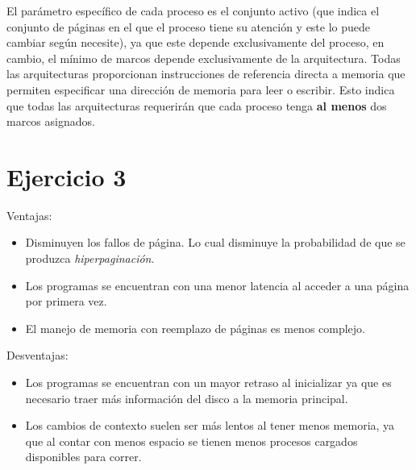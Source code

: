 \documentclass[11pt]{article}
\begin{document}
El parámetro específico de cada proceso es el conjunto activo (que indica el
conjunto de páginas en el que el proceso tiene su atención y este lo puede
cambiar según necesite), ya que este depende exclusivamente del proceso,
en cambio, el mínimo de marcos depende exclusivamente de la arquitectura.
Todas las arquitecturas proporcionan instrucciones de referencia directa a
memoria que permiten especificar una dirección de memoria para leer o escribir.
Esto indica que todas las arquitecturas requerirán que cada proceso tenga
\textbf{al menos} dos marcos asignados.

\section*{Ejercicio 3}

Ventajas:

\begin{itemize}
    \item Disminuyen los fallos de página. Lo cual disminuye la probabilidad de
          que se produzca \emph{hiperpaginación}.
    \item Los programas se encuentran con una menor latencia al acceder a una
          página por primera vez.
    \item El manejo de memoria con reemplazo de páginas es menos complejo.
\end{itemize}

Desventajas:

\begin{itemize}
    \item Los programas se encuentran con un mayor retraso al inicializar
          ya que es necesario traer más información del disco a la memoria principal.
    \item Los cambios de contexto suelen ser más lentos al tener menos memoria,
          ya que al contar con menos espacio se tienen menos procesos cargados
          disponibles para correr.
\end{itemize}
\end{document}
